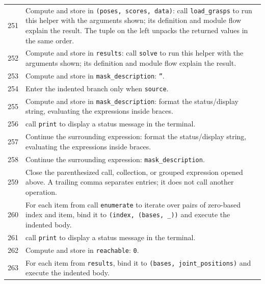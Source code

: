 \documentclass[11pt,a4paper]{book}
\begin{document}
\begin{longtable}{r p{}}
251 & Compute and store in \texttt{(poses, scores, data)}: call \texttt{load\_grasps} to run this helper with the arguments shown; its definition and module flow explain the result. The tuple on the left unpacks the returned values in the same order. \\

252 & Compute and store in \texttt{results}: call \texttt{solve} to run this helper with the arguments shown; its definition and module flow explain the result.  \\

253 & Compute and store in \texttt{mask\_description}: \texttt{''}.  \\

254 & Enter the indented branch only when \texttt{source}. \\

255 & Compute and store in \texttt{mask\_description}: format the status/display string, evaluating the expressions inside braces.  \\

256 & call \texttt{print} to display a status message in the terminal. \\

257 & Continue the surrounding expression: format the status/display string, evaluating the expressions inside braces. \\

258 & Continue the surrounding expression: \texttt{mask\_description}. \\

259 & Close the parenthesized call, collection, or grouped expression opened above. A trailing comma separates entries; it does not call another operation. \\

260 & For each item from call \texttt{enumerate} to iterate over pairs of zero-based index and item, bind it to \texttt{(index, (bases, \_))} and execute the indented body. \\

261 & call \texttt{print} to display a status message in the terminal. \\

262 & Compute and store in \texttt{reachable}: \texttt{0}.  \\

263 & For each item from \texttt{results}, bind it to \texttt{(bases, joint\_positions)} and execute the indented body. \\


\end{longtable}
\end{document}
